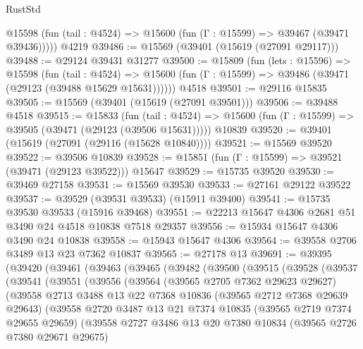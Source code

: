 \begin{lexlean}{RustStd}
\begin{coremodule}
      @15598 (fun (tail : @4524) => @15600 (fun (Γ : @15599) => @39467 (@39471 @39436)))))
    @4219
@39486 := @15569 (@39401 (@15619 (@27091 @29117)))
@39488 := @29124 @39431 @31277
@39500 := @15809
    (fun (lets : @15596) =>
    @15598
      (fun (tail : @4524) =>
      @15600 (fun (Γ : @15599) => @39486 (@39471 (@29123 (@39488 @15629 @15631))))))
    @4518
@39501 := @29116 @15835
@39505 := @15569 (@39401 (@15619 (@27091 @39501)))
@39506 := @39488 @4518
@39515 := @15833
    (fun (tail : @4524) => @15600 (fun (Γ : @15599) => @39505 (@39471 (@29123 (@39506 @15631)))))
    @10839
@39520 := @39401 (@15619 (@27091 (@29116 (@15628 @10840))))
@39521 := @15569 @39520
@39522 := @39506 @10839
@39528 := @15851 (fun (Γ : @15599) => @39521 (@39471 (@29123 @39522))) @15647
@39529 := @15735 @39520
@39530 := @39469 @27158
@39531 := @15569 @39530
@39533 := @27161 @29122 @39522
@39537 := @39529 (@39531 @39533) (@15911 @39400)
@39541 := @15735 @39530 @39533 (@15916 @39468)
@39551 := @22213 @15647 @4306 @2681 @51 @3490 @24 @4518 @10838 @7518 @29357
@39556 := @15934 @15647 @4306 @3490 @24 @10838
@39558 := @15943 @15647 @4306
@39564 := @39558 @2706 @3489 @13 @23 @7362 @10837
@39565 := @27178 @13
@39691 := @39395
    (@39420
      (@39461
        (@39463
          (@39465
            (@39482
              (@39500
                (@39515
                  (@39528
                    (@39537
                      (@39541
                        (@39551
                          (@39556
                            (@39564
                              (@39565 @2705 @7362 @29623 @29627)
                              (@39558
                                @2713
                                @3488
                                @13
                                @22
                                @7368
                                @10836
                                (@39565 @2712 @7368 @29639 @29643)
                                (@39558
                                  @2720
                                  @3487
                                  @13
                                  @21
                                  @7374
                                  @10835
                                  (@39565 @2719 @7374 @29655 @29659)
                                  (@39558
                                    @2727
                                    @3486
                                    @13
                                    @20
                                    @7380
                                    @10834
                                    (@39565 @2726 @7380 @29671 @29675)

\end{coremodule}
\end{lexlean}
